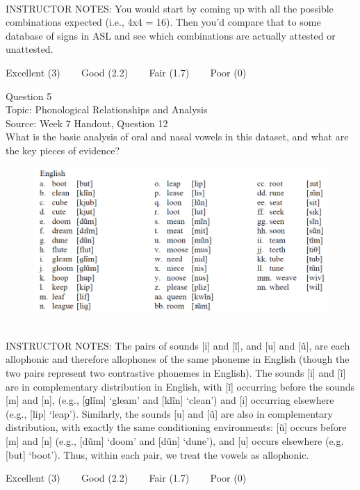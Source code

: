 \documentclass[12pt]{article}
\begin{document}
~\\
INSTRUCTOR NOTES: You would start by coming up with all the possible combinations expected (i.e., 4x4 = 16). Then you'd compare that to some database of signs in ASL and see which combinations are actually attested or unattested.


\vfill
Excellent (3) ~~~ Good (2.2) ~~~ Fair (1.7) ~~~ Poor (0)
\newpage

{\large Question 5}\\

Topic: Phonological Relationships and Analysis\\
Source: Week 7 Handout, Question 12\\

What is the basic analysis of oral and nasal vowels in this dataset, and what are the key pieces of evidence?\\

\begin{figure}[H]
\includegraphics{../images/english12.png}
\end{figure}

~\\
INSTRUCTOR NOTES: The pairs of sounds [i] and [ĩ], and [u] and [ũ], are each allophonic and therefore allophones of the same phoneme in English (though the two pairs represent two contrastive phonemes in English). The sounds [i] and [ĩ] are in complementary distribution in English, with [ĩ] occurring before the sounds [m] and [n], (e.g., [ɡlĩm] ‘gleam’ and [klĩn] ‘clean’) and [i] occurring elsewhere (e.g., [lip] ‘leap’). Similarly, the sounds [u] and [ũ] are also in complementary distribution, with exactly the same conditioning environments: [ũ] occurs before [m] and [n] (e.g., [dũm] ‘doom’ and [dũn] ‘dune’), and [u] occurs elsewhere (e.g. [but] ‘boot’). Thus, within each pair, we treat the vowels as allophonic. 


\vfill
Excellent (3) ~~~ Good (2.2) ~~~ Fair (1.7) ~~~ Poor (0)
\newpage
\end{document}
